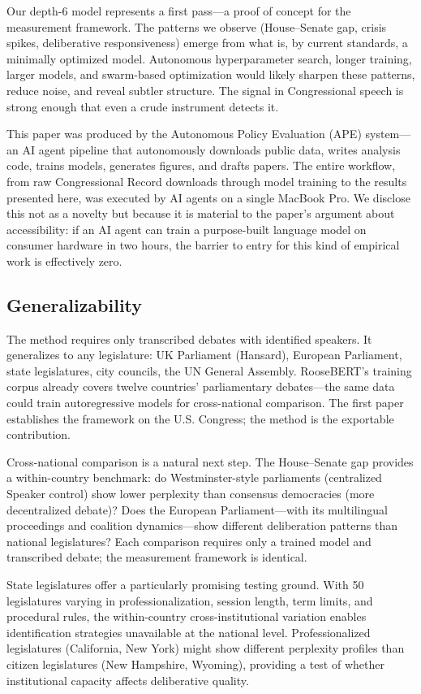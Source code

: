 \documentclass[12pt]{article}
\begin{document}
Our depth-6 model represents a first pass---a proof of concept for the measurement framework. The patterns we observe (House--Senate gap, crisis spikes, deliberative responsiveness) emerge from what is, by current standards, a minimally optimized model. Autonomous hyperparameter search, longer training, larger models, and swarm-based optimization would likely sharpen these patterns, reduce noise, and reveal subtler structure. The signal in Congressional speech is strong enough that even a crude instrument detects it.

This paper was produced by the Autonomous Policy Evaluation (APE) system---an AI agent pipeline that autonomously downloads public data, writes analysis code, trains models, generates figures, and drafts papers. The entire workflow, from raw Congressional Record downloads through model training to the results presented here, was executed by AI agents on a single MacBook Pro. We disclose this not as a novelty but because it is material to the paper's argument about accessibility: if an AI agent can train a purpose-built language model on consumer hardware in two hours, the barrier to entry for this kind of empirical work is effectively zero.

\subsection{Generalizability}

The method requires only transcribed debates with identified speakers. It generalizes to any legislature: UK Parliament (Hansard), European Parliament, state legislatures, city councils, the UN General Assembly. RooseBERT's training corpus \citep{evrard2025} already covers twelve countries' parliamentary debates---the same data could train autoregressive models for cross-national comparison. The first paper establishes the framework on the U.S. Congress; the method is the exportable contribution.

Cross-national comparison is a natural next step. The House--Senate gap provides a within-country benchmark: do Westminster-style parliaments (centralized Speaker control) show lower perplexity than consensus democracies (more decentralized debate)? Does the European Parliament---with its multilingual proceedings and coalition dynamics---show different deliberation patterns than national legislatures? Each comparison requires only a trained model and transcribed debate; the measurement framework is identical.

State legislatures offer a particularly promising testing ground. With 50 legislatures varying in professionalization, session length, term limits, and procedural rules, the within-country cross-institutional variation enables identification strategies unavailable at the national level. Professionalized legislatures (California, New York) might show different perplexity profiles than citizen legislatures (New Hampshire, Wyoming), providing a test of whether institutional capacity affects deliberative quality.
\end{document}
